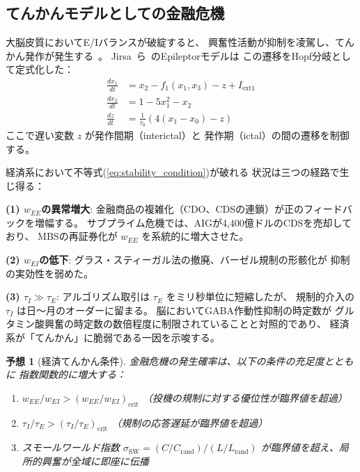 \documentclass[12pt,twocolumn]{ltjsarticle}
\newtheorem{conjecture}{予想}
\begin{document}
\subsection{てんかんモデルとしての金融危機}

大脳皮質においてE/Iバランスが破綻すると、
興奮性活動が抑制を凌駕し、てんかん発作が発生する~\cite{Trevelyan2006}。
Jirsa~ら~\cite{Jirsa2014}のEpileptorモデルは
この遷移をHopf分岐として定式化した：
\begin{align}
\frac{dx_1}{dt} &= x_2 - f_1(x_1, x_3) - z + I_{\text{ext1}} \\
\frac{dx_2}{dt} &= 1 - 5x_1^2 - x_2 \\
\frac{dz}{dt} &= \frac{1}{\tau_0}\left(4(x_1 - x_0) - z\right)
\end{align}
ここで遅い変数 $z$ が発作間期（interictal）と
発作期（ictal）の間の遷移を制御する。

経済系において不等式(\ref{eq:stability_condition})が破れる
状況は三つの経路で生じ得る：

\textbf{(1) $w_{EE}$の異常増大}:
金融商品の複雑化（CDO、CDSの連鎖）が正のフィードバックを増幅する。
サブプライム危機では、AIGが4,400億ドルのCDSを売却しており、
MBSの再証券化が $w_{EE}$ を系統的に増大させた。

\textbf{(2) $w_{EI}$の低下}:
グラス・スティーガル法の撤廃、バーゼル規制の形骸化が
抑制の実効性を弱めた。

\textbf{(3) $\tau_I \gg \tau_E$}:
アルゴリズム取引は $\tau_E$ をミリ秒単位に短縮したが、
規制的介入の $\tau_I$ は日〜月のオーダーに留まる。
脳においてGABA作動性抑制の時定数が
グルタミン酸興奮の時定数の数倍程度に制限されていることと対照的であり、
経済系が「てんかん」に脆弱である一因を示唆する。

\begin{conjecture}[経済てんかん条件]
\label{conj:epilepsy}
金融危機の発生確率は、以下の条件の充足度とともに
指数関数的に増大する：
\begin{enumerate}
\item $w_{EE}/w_{EI} > (w_{EE}/w_{EI})_{\text{crit}}$
\quad （投機の規制に対する優位性が臨界値を超過）
\item $\tau_I/\tau_E > (\tau_I/\tau_E)_{\text{crit}}$
\quad （規制の応答遅延が臨界値を超過）
\item スモールワールド指数
$\sigma_{\text{SW}} = (C/C_{\text{rand}}) / (L/L_{\text{rand}})$
が臨界値を超え、局所的興奮が全域に即座に伝播
\end{enumerate}
\end{conjecture}
\end{document}
